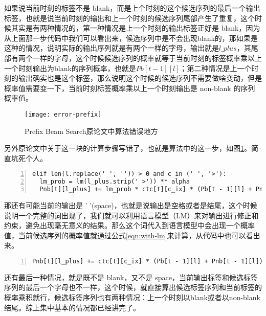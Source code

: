 {{如果说当前时刻的标签不是 blank，而是上个时刻的这个候选序列的最后一个输出标签，也就是说当前时刻的输出和上一个时刻的候选序列尾部产生了重复，这个时候其实是有两种情况的，第一种情况是上一个时刻的输出标签正好是 blank，因为从上面那一步代码中我们可以看出来，候选序列中是不会出现blank的，那如果是这种的情况，说明实际的输出序列就是有两个一样的字母，输出就是$l\_plus$，其尾部有两个一样的字母，这个时候候选序列的概率就等于当前时刻的标签概率乘以上一个时刻输出为blank的序列概率，也就是$Pb[t - 1][l]$；第二种情况是上一个时刻的输出确实也是这个标签，那么说明这个时候的候选序列不需要做啥变动，但是概率值需要变一下，当前时刻标签概率乘以上一个时刻输出是 non-blank 的序列概率值。

\begin{figure}[h]
  \centering
  \texttt{[image: error-prefix]}
  \caption{Prefix Beam Search原论文中算法错误地方 \label{fig:error-prefix}}
\end{figure}

另外原论文中关于这一块的计算步骤写错了，也就是算法中的这一步，如图\ref{fig:error-prefix}。简直坑死个人。

\begin{lstlisting}[language = shell, numbers=left, 
         numberstyle=\tiny,keywordstyle=\color{blue!70},
         commentstyle=\color{red!50!green!50!blue!50},frame=shadowbox,
         rulesepcolor=\color{red!20!green!20!blue!20},basicstyle=\ttfamily]
elif len(l.replace(' ', '')) > 0 and c in (' ', '>'):
  lm_prob = lm(l_plus.strip(' >')) ** alpha
  Pnb[t][l_plus] += lm_prob * ctc[t][c_ix] * (Pb[t - 1][l] + Pnb[t - 1][l])
\end{lstlisting}

那还有可能当前的输出是 ' '(space)，也就是说输出是空格或者是结尾，这个时候说明一个完整的词出现了，我们就可以利用语言模型（LM）来对输出进行修正和约束，避免出现毫无意义的结果。那么这个词代入到语言模型中会出现一个概率值，当前候选序列的概率值就通过公式\ref{eqn:with-lm}来计算，从代码中也可以看出来。

\begin{lstlisting}[language = shell, numbers=left, 
         numberstyle=\tiny,keywordstyle=\color{blue!70},
         commentstyle=\color{red!50!green!50!blue!50},frame=shadowbox,
         rulesepcolor=\color{red!20!green!20!blue!20},basicstyle=\ttfamily]
Pnb[t][l_plus] += ctc[t][c_ix] * (Pb[t - 1][l] + Pnb[t - 1][l])
\end{lstlisting}

还有最后一种情况，就是既不是 blank，又不是 space，当前输出标签和候选标签序列的最后一个字母也不一样，这个时候，就直接算出候选标签序列和当前标签的概率乘积就行，候选标签序列也有两种情况：上一个时刻以blank或者以non-blank结尾。综上集中基本的情况都已经讲完了。

}}
